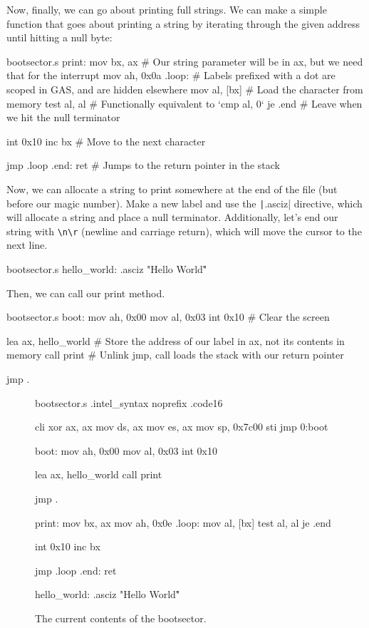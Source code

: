 \documentclass{article}
\begin{document}
Now, finally, we can go about printing full strings. We can make a simple function that goes about printing
a string by iterating through the given address until hitting a null byte:

\begin{gas}{bootsector.s}
	print:
		mov bx, ax # Our string parameter will be in ax, but we need that for the interrupt
		mov ah, 0x0a
	.loop: # Labels prefixed with a dot are scoped in GAS, and are hidden elsewhere
		mov al, [bx] # Load the character from memory
		test al, al # Functionally equivalent to `cmp al, 0`
		je .end # Leave when we hit the null terminator
		
		int 0x10
		inc bx # Move to the next character
		
		jmp .loop
	.end:
		ret # Jumps to the return pointer in the stack
\end{gas}

Now, we can allocate a string to print somewhere at the end of the file (but before our magic number).
Make a new label and use the \texttt|.asciz| directive, which will allocate a string and place
a null terminator. Additionally, let's end our string with \Verb|\n\r| (newline and carriage return),
which will move the cursor to the next line.

\begin{gas}{bootsector.s}
	hello_world: .asciz "Hello World\n\r"
\end{gas}

Then, we can call our print method.

\begin{gas}{bootsector.s}
	boot:
		mov ah, 0x00
		mov al, 0x03
		int 0x10 # Clear the screen
	
		lea ax, hello_world # Store the address of our label in ax, not its contents in memory
		call print # Unlink jmp, call loads the stack with our return pointer
		
		jmp .
\end{gas}

\begin{figure}[H]
	\begin{gas}{bootsector.s}
		.intel_syntax noprefix
		.code16
		
			cli
			xor ax, ax
			mov ds, ax
			mov es, ax
			mov sp, 0x7c00
			sti
			jmp 0:boot
		
		boot:
			mov ah, 0x00
			mov al, 0x03
			int 0x10
		
			lea ax, hello_world
			call print
			
			jmp .
			
		print:
			mov bx, ax
			mov ah, 0x0e
		.loop:
			mov al, [bx]
			test al, al
			je .end
		
			int 0x10
			inc bx
		
			jmp .loop
		.end:
			ret
		
		hello_world: .asciz "Hello World\n\r"
	\end{gas}
	\caption{The current contents of the bootsector.}
\end{figure}
\end{document}
